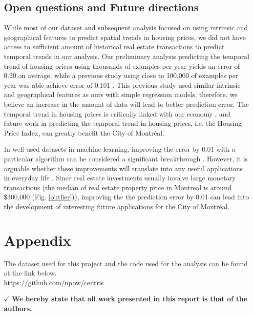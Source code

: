 \documentclass[conference]{IEEEtran}
\begin{document}
\subsection{Open questions and Future directions}
While most of our dataset and subsequent analysis focused on using intrinsic and geographical features to predict spatial trends in housing prices, we did not have access to sufficient amount of historical real estate transactions to predict temporal trends in our analysis. Our preliminary analysis predicting the temporal trend of housing prices using thousands of examples per year yields an error of 0.20 on average, while a previous study using close to 100,000 of examples per year was able achieve error of 0.101 \cite{Caplin08machinelearning}. This previous study used similar intrinsic and geographical features as ours with simple regression models, therefore, we believe an increase in the amount of data will lead to better prediction error. The temporal trend in housing prices is critically linked with our economy \cite{NBERw13553}, and future work in predicting the temporal trend in housing prices, i.e. the Housing Price Index, can greatly benefit the City of Montr\'eal.

In well-used datasets in machine learning, improving the error by 0.01 with a particular algorithm can be considered a significant breakthrough \cite{GlorotAISTATS2010, lecun-98, Schmidhuber:2012:MDN:2354409.2354694}. However, it is arguable whether these improvements will translate into any useful applications in everyday life \cite{DBLP:journals/corr/abs-1206-4656}. Since real estate investments usually involve large monetary transactions (the median of real estate property price in Montreal is around \$300,000 (Fig. \ref{outlier})), improving the the prediction error by 0.01 can lead into the development of interesting future applications for the City of Montr\'eal.

\section*{Appendix}

The dataset used for this project and the code used for the analysis can be found at the link below.\\
{\scriptsize https://github.com/npow/centris}

$\checkmark$ \textbf{We hereby state that all work presented in this report is that of the authors.}

\printbibliography[heading=bibintoc,title={Reference}]

\end{document}

